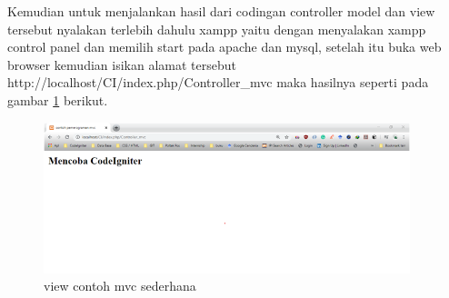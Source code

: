 Kemudian untuk menjalankan hasil dari codingan controller model dan view tersebut nyalakan terlebih dahulu xampp yaitu dengan menyalakan xampp control panel dan memilih start pada apache dan mysql, setelah itu buka web browser kemudian isikan alamat tersebut http://localhost/CI/index.php/Controller\_mvc maka hasilnya seperti pada gambar \ref{mvc7} berikut.

\begin{figure}[h]
	\centerline{\includegraphics[width=0.95\textwidth]{figures/MVC/7.png}}
	\caption{view contoh mvc sederhana}
	\label{mvc7}
\end{figure}

